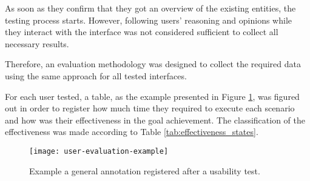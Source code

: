 As soon as they confirm that they got an overview of the existing entities, the testing process starts. However, following users' reasoning and opinions while they interact with the interface was not considered sufficient to collect all necessary results.

Therefore, an evaluation methodology was designed to collect the required data using the same approach for all tested interfaces.

For each user tested, a table, as the example presented in Figure \ref{fig:userEvaluationExample}, was figured out in order to register how much time they required to execute each scenario and how was their effectiveness in the goal achievement. The classification of the effectiveness was made according to Table \ref{tab:effectiveness_states}.

\begin{figure}[htbp]
	\centering
	\texttt{[image: user-evaluation-example]}
	\caption{Example a general annotation registered after a usability test.}
	\label{fig:userEvaluationExample}
\end{figure}

